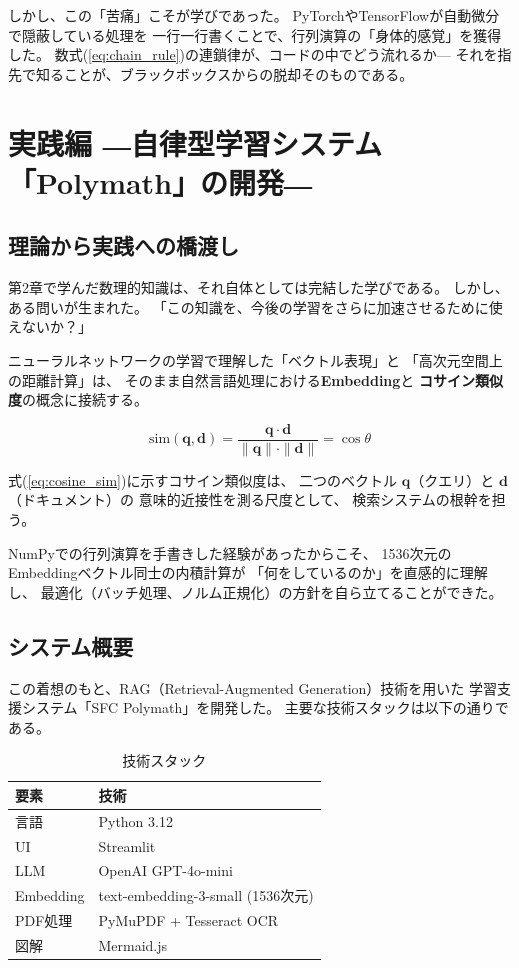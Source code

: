 \documentclass[uplatex, dvipdfmx, a4paper, 11pt]{jsarticle}
\begin{document}
しかし、この「苦痛」こそが学びであった。
PyTorchやTensorFlowが自動微分で隠蔽している処理を
一行一行書くことで、行列演算の「身体的感覚」を獲得した。
数式(\ref{eq:chain_rule})の連鎖律が、コードの中でどう流れるか---
それを指先で知ることが、ブラックボックスからの脱却そのものである。


\section{実践編 ―自律型学習システム「Polymath」の開発―}

\subsection{理論から実践への橋渡し}
第2章で学んだ数理的知識は、それ自体としては完結した学びである。
しかし、ある問いが生まれた。
「この知識を、今後の学習をさらに加速させるために使えないか？」

ニューラルネットワークの学習で理解した「ベクトル表現」と
「高次元空間上の距離計算」は、
そのまま自然言語処理における\textbf{Embedding}と
\textbf{コサイン類似度}の概念に接続する。

\begin{equation}
    \text{sim}(\bm{q}, \bm{d}) = \frac{\bm{q} \cdot \bm{d}}{\|\bm{q}\| \cdot \|\bm{d}\|}
    = \cos\theta
    \label{eq:cosine_sim}
\end{equation}

式(\ref{eq:cosine_sim})に示すコサイン類似度は、
二つのベクトル $\bm{q}$（クエリ）と $\bm{d}$（ドキュメント）の
意味的近接性を測る尺度として、
検索システムの根幹を担う。

NumPyでの行列演算を手書きした経験があったからこそ、
1536次元のEmbeddingベクトル同士の内積計算が
「何をしているのか」を直感的に理解し、
最適化（バッチ処理、ノルム正規化）の方針を自ら立てることができた。

\subsection{システム概要}
この着想のもと、RAG（Retrieval-Augmented Generation）技術を用いた
学習支援システム「SFC Polymath」を開発した。
主要な技術スタックは以下の通りである。

\begin{table}[H]
\centering
\begin{tabular}{ll}
\hline
\textbf{要素} & \textbf{技術} \\
\hline
言語 & Python 3.12 \\
UI & Streamlit \\
LLM & OpenAI GPT-4o-mini \\
Embedding & text-embedding-3-small (1536次元) \\
PDF処理 & PyMuPDF + Tesseract OCR \\
図解 & Mermaid.js \\
\hline
\end{tabular}
\caption{技術スタック}
\label{tab:stack}
\end{table}
\end{document}
